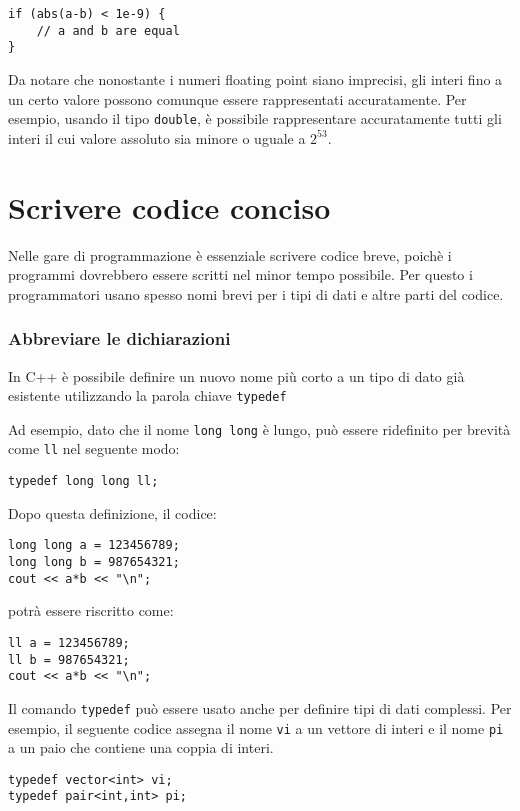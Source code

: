 \begin{lstlisting}
if (abs(a-b) < 1e-9) {
    // a and b are equal
}
\end{lstlisting}

Da notare che nonostante i numeri floating point siano imprecisi,
gli interi fino a un certo valore possono comunque essere rappresentati accuratamente.
Per esempio, usando il tipo \texttt{double}, 
è possibile rappresentare accuratamente tutti gli interi il cui valore
assoluto sia minore o uguale a $2^{53}$.

\section{Scrivere codice conciso}

Nelle gare di programmazione è essenziale scrivere codice breve,
poichè i programmi dovrebbero essere scritti nel minor tempo possibile.
Per questo i programmatori usano spesso nomi brevi per
i tipi di dati e altre parti del codice.

\subsubsection{Abbreviare le dichiarazioni}
In C++ è possibile definire un nuovo nome più corto
a un tipo di dato già esistente
utilizzando la parola chiave \texttt{typedef}

Ad esempio, dato che il nome \texttt{long long} è lungo,
può essere ridefinito per brevità come \texttt{ll} nel seguente modo:

\begin{lstlisting}
typedef long long ll;
\end{lstlisting}
Dopo questa definizione, il codice:
\begin{lstlisting}
long long a = 123456789;
long long b = 987654321;
cout << a*b << "\n";
\end{lstlisting}
potrà essere riscritto come:
\begin{lstlisting}
ll a = 123456789;
ll b = 987654321;
cout << a*b << "\n";
\end{lstlisting}

Il comando \texttt{typedef} può essere usato
anche per definire tipi di dati complessi.
Per esempio, il seguente codice assegna il nome \texttt{vi}
a un vettore di interi e il nome \texttt{pi} a un paio che contiene
una coppia di interi.

\begin{lstlisting}
typedef vector<int> vi;
typedef pair<int,int> pi;
\end{lstlisting}


